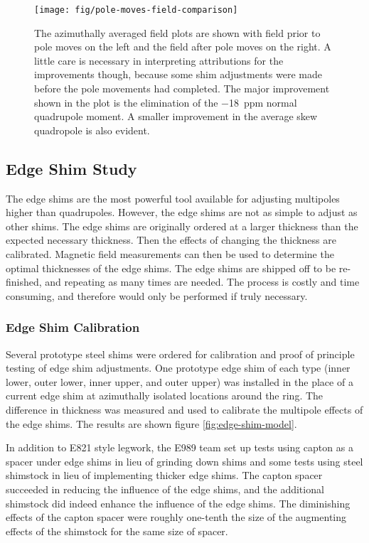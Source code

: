 \begin{figure}
\centering
\texttt{[image: fig/pole-moves-field-comparison]}
\caption{
    The azimuthally averaged field plots are shown with field prior to pole moves on the left and the field after pole moves on the right.  A little care is necessary in interpreting attributions for the improvements though, because some shim adjustments were made before the pole movements had completed.  The major improvement shown in the plot is the elimination of the \SI{-18}{ppm} normal quadrupole moment.  A smaller improvement in the average skew quadropole is also evident. 
    \label{fig:pole-moves-field-comparison}
}
\end{figure}

\subsection{Edge Shim Study}

The edge shims are the most powerful tool available for adjusting multipoles higher than quadrupoles.  However, the edge shims are not as simple to adjust as other shims.  The edge shims are originally ordered at a larger thickness than the expected necessary thickness.  Then the effects of changing the thickness are calibrated.  Magnetic field measurements can then be used to determine the optimal thicknesses of the edge shims.  The edge shims are shipped off to be re-finished, and repeating as many times are needed.  The process is costly and time consuming, and therefore would only be performed if truly necessary.

\subsubsection{Edge Shim Calibration}

Several prototype steel shims were ordered for calibration and proof of principle testing of edge shim adjustments.  One prototype edge shim of each type (inner lower, outer lower, inner upper, and outer upper) was installed in the place of a current edge shim at azimuthally isolated locations around the ring.  The difference in thickness was measured and used to calibrate the multipole effects of the edge shims.  The results are shown figure \ref{fig:edge-shim-model}. 

In addition to E821 style legwork, the E989 team set up tests using capton as a spacer under edge shims in lieu of grinding down shims and some tests using steel shimstock in lieu of implementing thicker edge shims.  The capton spacer succeeded in reducing the influence of the edge shims, and the additional shimstock did indeed enhance the influence of the edge shims.  The diminishing effects of the capton spacer were roughly one-tenth the size of the augmenting effects of the shimstock for the same size of spacer.

